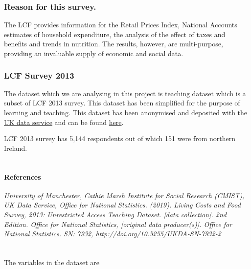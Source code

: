 \documentclass[]{article}
\let\oldparagraph\paragraph
\renewcommand{\paragraph}[1]{\oldparagraph{#1}\mbox{}}
\begin{document}
\hypertarget{reason-for-this-survey.}{%
\subsubsection{Reason for this survey.}\label{reason-for-this-survey.}}

The LCF provides information for the Retail Prices Index, National
Accounts estimates of household expenditure, the analysis of the effect
of taxes and benefits and trends in nutrition. The results, however, are
multi-purpose, providing an invaluable supply of economic and social
data.

\hypertarget{lcf-survey-2013}{%
\subsubsection{LCF Survey 2013}\label{lcf-survey-2013}}

The dataset which we are analysing in this project is teaching dataset
which is a subset of LCF 2013 survey. This dataset has been simplified
for the purpose of learning and teaching. This dataset has been
anonymised and deposited with the \href{https://ukdataservice.ac.uk}{UK
data service} and can be found
\href{https://beta.ukdataservice.ac.uk/datacatalogue/studies/study?id=7932\#!/details}{here}.

LCF 2013 survey has 5,144 respondents out of which 151 were from
northern Ireland.\\
~\\

\hypertarget{references}{%
\paragraph{References}\label{references}}

\emph{University of Manchester, Cathie Marsh Institute for Social
Research (CMIST), UK Data Service, Office for National Statistics.
(2019). Living Costs and Food Survey, 2013: Unrestricted Access Teaching
Dataset. {[}data collection{]}. 2nd Edition. Office for National
Statistics, {[}original data producer(s){]}. Office for National
Statistics. SN: 7932, \url{http://doi.org/10.5255/UKDA-SN-7932-2}}\\
~\\
~\\

The variables in the dataset are
\end{document}

